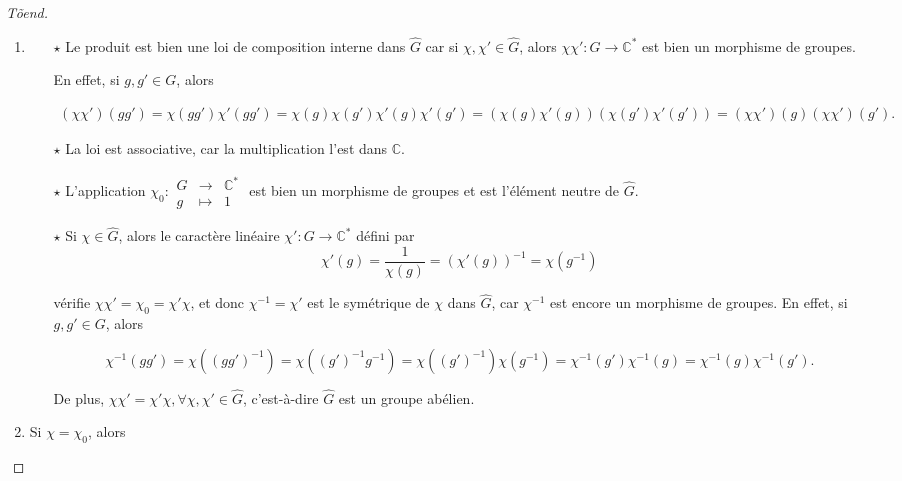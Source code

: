 \documentclass[french]{book}
\theoremstyle{definition}
\begin{document}
  \begin{proof}[T\~{o}end]

    \

  \begin{enumerate}
    \item \begin{itemize}
      \item[$\star$] Le produit est bien une loi de composition interne dans \(\hat{G}\) car si \(\chi, \chi' \in \hat{G}\), alors \(\chi \chi' : G \longrightarrow \mathbb{C} ^{*}\) est bien un morphisme de groupes.

      En effet, si \(g, g' \in G\), alors

      \begin{gather*}
        (\chi \chi')(gg') = \chi(gg') \chi'(gg') = \chi(g)\chi(g') \chi'(g)\chi'(g') = (\chi(g) \chi'(g))(\chi(g')\chi'(g')) = (\chi\chi')(g)(\chi\chi')(g').
      \end{gather*}

      \item[$\star$] La loi est associative, car la multiplication l'est dans \(\mathbb{C}\).
      \item[$\star$] L'application \(\chi _{0} : \begin{matrix}
      G & \longrightarrow & \mathbb{C} ^{*} \\
      g & \longmapsto & 1
      \end{matrix}\) est bien un morphisme de groupes et est l'élément neutre de \(\hat{G}\).

      \item[$\star$] Si \(\chi \in \hat{G}\), alors le caractère linéaire \(\chi' : G \longrightarrow \mathbb{C} ^{*}\) défini par \[\chi'(g) = \frac{1}{\chi(g)} = (\chi'(g)) ^{-1} = \chi(g ^{-1})\]

      vérifie \(\chi \chi' = \chi _{0} = \chi'\chi\), et donc \(\chi ^{-1} = \chi'\) est le symétrique de \(\chi\) dans \(\hat{G} \), car \(\chi ^{-1}\) est encore un morphisme de groupes. En effet, si \(g, g' \in G\), alors

      \[\chi ^{-1}(gg') = \chi((gg') ^{-1}) = \chi ((g')^{-1} g ^{-1}) = \chi((g')^{-1}) \chi(g ^{-1}) = \chi ^{-1}(g') \chi ^{-1}(g) = \chi ^{-1}(g) \chi ^{-1}(g').\]

      De plus, \(\chi \chi' = \chi' \chi, \forall \chi, \chi' \in \hat{G}\), c'est-à-dire \(\hat{G}\) est un groupe abélien.
    \end{itemize}

    \item Si \(\chi = \chi_0\), alors


\end{enumerate}
\end{proof}
\end{document}
